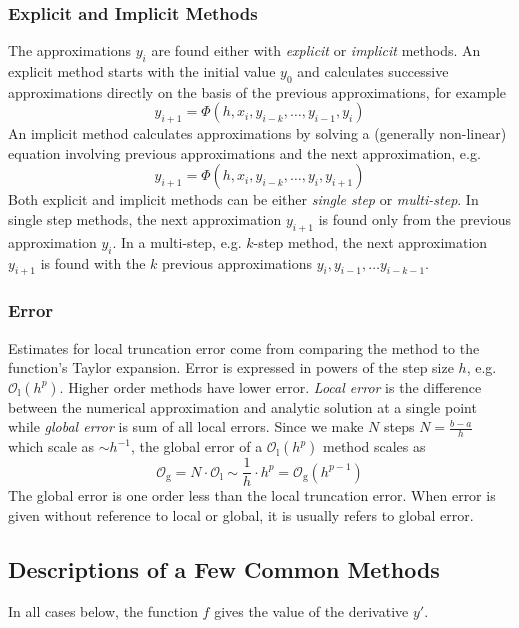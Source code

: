 \documentclass[11pt, a4paper]{article}
\renewcommand{\O}{\mathcal{O}}  %
\begin{document}
\subsubsection{Explicit and Implicit Methods}
The approximations $ y_{i} $ are found either with \textit{explicit} or \textit{implicit} methods. An explicit method starts with the initial value $ y_{0} $ and calculates successive approximations directly on the basis of the previous approximations, for example
\begin{equation*}
	y_{i+1} = \Phi(h, x_{i}, y_{i-k}, \ldots, y_{i-1}, y_{i})
\end{equation*}
An implicit method calculates approximations by solving a (generally non-linear) equation involving previous approximations and the next approximation, e.g.
\begin{equation*}
	y_{i+1} = \Phi(h, x_{i}, y_{i-k}, \ldots, y_{i}, y_{i+1})
\end{equation*}
Both explicit and implicit methods can be either \textit{single step} or \textit{multi-step}. In single step methods, the next approximation $ y_{i+1} $ is found only from the previous approximation $ y_{i} $. In a multi-step, e.g. $ k $-step method, the next approximation $ y_{i+1} $ is found with the $ k $  previous approximations $ y_{i}, y_{i-1}, \ldots y_{i-k-1} $.

\subsubsection{Error}
Estimates for local truncation error come from comparing the method to the function's Taylor expansion. Error is expressed in powers of the step size $ h $, e.g. $ \O_{\text{l}}(h^{p})$. Higher order methods have lower error. \textit{Local error} is the difference between the numerical approximation and analytic solution at a single point while \textit{global error} is sum of all local errors. Since we make $ N $ steps $ N = \frac{b-a}{h} $ which scale as $ \sim h^{-1} $, the global error of a $ \O_{\text{l}}(h^{p}) $ method scales as
\begin{equation*}
	\O_{\text{g}} = N \cdot \O_{\text{l}} \sim \frac{1}{h} \cdot h^{p} = \O_{\text{g}}(h^{p-1})
\end{equation*}
The global error is one order less than the local truncation error. When error is given without reference to local or global, it is usually refers to global error. 

\subsection{Descriptions of a Few Common Methods}
In all cases below, the function $ f $ gives the value of the derivative $ y' $. 
\end{document}
